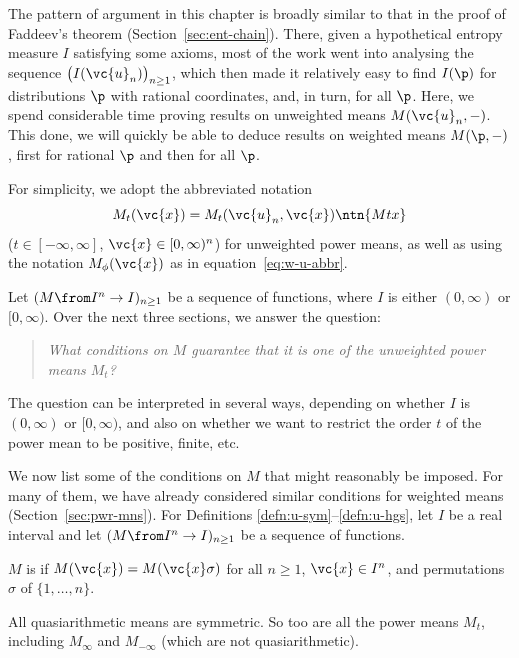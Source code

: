 The pattern of argument in this chapter is broadly similar to that in the
proof of Faddeev's theorem (Section~\ref{sec:ent-chain}).  There, given a
hypothetical entropy measure $I$ satisfying some axioms, most of the work
went into analysing the sequence $\bigl(I(\vc{u}_n)\bigr)_{n \geq 1}$,
which then made it relatively easy to find $I(\p)$ for distributions $\p$
with rational coordinates, and, in turn, for all $\p$.  Here, we
spend considerable time proving results on unweighted means $M(\vc{u}_n,
-)$.  This done, we will quickly be able to deduce results on weighted
means $M(\p, -)$, first for rational $\p$ and then for all $\p$.

For simplicity, we adopt the abbreviated notation
\[
M_t(\vc{x}) = M_t(\vc{u}_n, \vc{x})
\ntn{Mtx}
\]
($t \in [-\infty, \infty]$, $\vc{x} \in [0, \infty)^n$) for unweighted
  power means, as well as using the notation $M_\phi(\vc{x})$ as in
  equation~\eqref{eq:w-u-abbr}. 

Let $(M \from I^n \to I)_{n \geq 1}$ be a sequence of functions, where $I$
is either $(0, \infty)$ or $[0, \infty)$.  Over the next three sections, we
  answer the question:
% 
\begin{quote}
\emph{What conditions on $M$ guarantee that it is one of the unweighted
  power means $M_t$?}  
\end{quote}
% 
The question can be interpreted in several ways, depending on whether $I$
is $(0, \infty)$ or $[0, \infty)$, and also on whether we want to restrict
  the order $t$ of the power mean to be positive, finite, etc.  

We now list some of the conditions on $M$ that might reasonably be imposed.
For many of them, we have already considered similar conditions for
weighted means (Section~\ref{sec:pwr-mns}).  For Definitions
\ref{defn:u-sym}--\ref{defn:u-hgs}, let $I$ be a real interval and let $(M
\from I^n \to I)_{n \geq 1}$ be a sequence of functions.

\begin{defn}
$M$ is %
%
% 
if $M(\vc{x}) = M(\vc{x}\sigma)$ for all $n \geq 1$, $\vc{x} \in I^n$, and
permutations $\sigma$ of $\{1, \ldots, n\}$.
\end{defn}

\begin{examples}
All quasiarithmetic means are symmetric. So too are all the power means
$M_t$, including $M_\infty$ and $M_{-\infty}$ (which are not
quasiarithmetic).
\end{examples}

